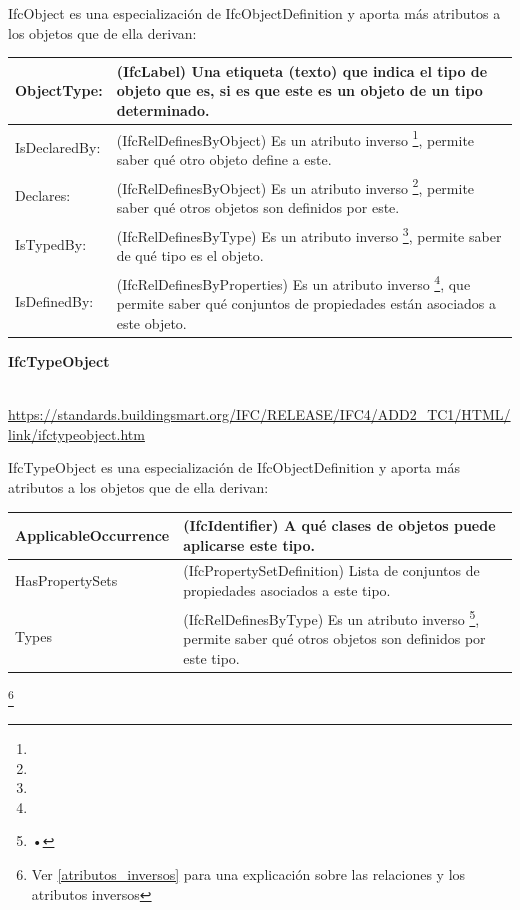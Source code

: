 \documentclass[spanish,12pt,a4paper,final,oneside]{book}
\begin{document}
IfcObject es una especialización de IfcObjectDefinition y aporta más atributos a los objetos que de ella derivan:

\begin{longtable}{|p{2.5cm} p{11cm}|}
\hline

ObjectType: & (IfcLabel) Una etiqueta (texto) que indica el tipo de objeto que es, si es que este es un objeto de un tipo determinado. 
\\[0.1cm] \hline

IsDeclaredBy: & (IfcRelDefinesByObject) Es un atributo inverso \footnote{}, permite saber qué otro objeto define a este.
\\[0.1cm] \hline

Declares: & (IfcRelDefinesByObject)  Es un atributo inverso \footnote{}, permite saber qué otros objetos son definidos por este.
\\[0.1cm] \hline

IsTypedBy: & (IfcRelDefinesByType) Es un atributo inverso \footnote{}, permite saber de qué tipo es el objeto.
\\[0.1cm] \hline

IsDefinedBy: & (IfcRelDefinesByProperties) Es un atributo inverso \footnote{}, que permite saber qué conjuntos de propiedades están asociados a este objeto.
\\[0.1cm] \hline

\end{longtable}


\vspace{0.5cm}

\begin{large}\textbf{IfcTypeObject}\end{large}
\\ \url{https://standards.buildingsmart.org/IFC/RELEASE/IFC4/ADD2_TC1/HTML/link/ifctypeobject.htm}

IfcTypeObject es una especialización de IfcObjectDefinition y aporta más atributos a los objetos que de ella derivan:

\begin{longtable}{|p{3cm} p{10cm}|}
\hline

ApplicableOccurrence & (IfcIdentifier) A qué clases de objetos puede aplicarse este tipo.
\\[0.1cm] \hline

HasPropertySets & (IfcPropertySetDefinition) Lista de conjuntos de propiedades asociados a este tipo.
\\[0.1cm] \hline

Types & (IfcRelDefinesByType) Es un atributo inverso \footnote{•}, permite saber qué otros objetos son definidos por este tipo.
\\[0.1cm] \hline

\end{longtable}
\footnote{Ver \ref{atributos_inversos} para una explicación sobre las relaciones y los atributos inversos}
\end{document}
